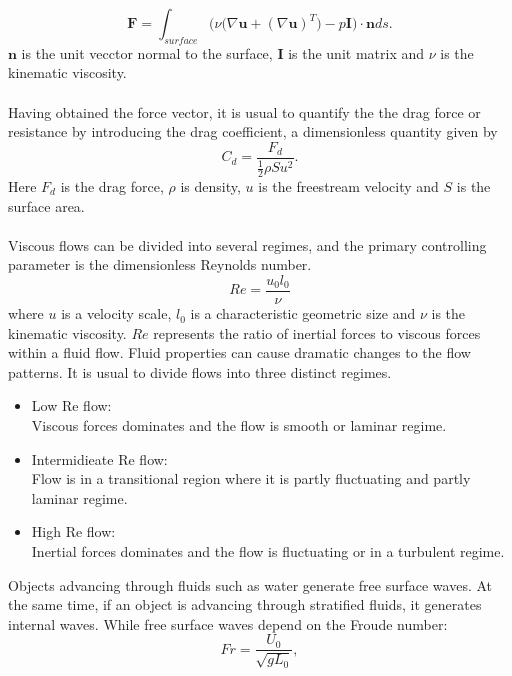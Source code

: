 \documentclass[a4paper, 12pt]{report}
\begin{document}
\begin{equation}
\mathbf{F} = \int_{surface} \Big(\nu\big(\nabla \mathbf{u} + (\nabla \mathbf{u})^T\big) - p \mathbf{I}\Big) \cdot \mathbf{n} ds.
\label{eqn:forceVector}
\end{equation}
$\mathbf{n}$ is the unit vecctor normal to the surface, $\mathbf {I}$ is the unit matrix and $\nu$ is the kinematic viscosity. \\
\\
Having obtained the force vector, it is usual to quantify the the drag force or resistance by introducing the drag coefficient, a dimensionless quantity given by
\begin{equation}
C_d = \frac{F_d}{\frac{1}{2}\rho S u^2}.
\label{eqn:dragCoeff}
\end{equation}
Here $F_d$ is the drag force, $\rho$ is density, $u$ is the freestream velocity and $S$ is the surface area. \\
\\
Viscous flows can be divided into several regimes, and the primary controlling parameter is the dimensionless Reynolds number\cite{White}.
\begin{equation}
Re = \frac{u_0l_0}{\nu}
\label{eqn:ReynoldsNumber}
\end{equation}
where $u$ is a velocity scale, $l_0$ is a characteristic geometric size and $\nu$ is the kinematic viscosity. $Re$ represents the ratio of inertial forces to viscous forces within a fluid flow. Fluid properties can cause dramatic changes to the flow patterns. It is usual to divide flows into three distinct regimes.
\begin{itemize}
	\item Low Re flow: \\ Viscous forces dominates and the flow is smooth or laminar regime.
	\item Intermidieate Re flow: \\ Flow is in a transitional region where it is partly fluctuating and partly laminar regime.
	\item High Re flow: \\ Inertial forces dominates and the flow is fluctuating or in a turbulent regime.
\end{itemize} 
Objects advancing through fluids such as water generate free surface waves. At the same time, if an object is advancing through stratified fluids, it generates internal waves. While free surface waves depend on the Froude number: 
\begin{equation}
Fr = \frac{U_0}{\sqrt{gL_0}},
\label{eqn:FroudeNumber}
\end{equation} 
\end{document}
